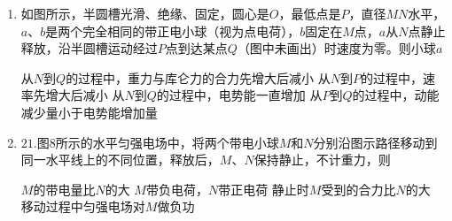 \begin{enumerate}[leftmargin=0em]
\begin{enumerate}
\end{enumerate}
\begin{figure}[h!]
\flushright

\end{figure}




\item
{}
如图所示，半圆槽光滑、绝缘、固定，圆心是$ O $，最低点是$ P $，直径$ MN $水平，$ a $、$ b $是两个完全相同的带正电小球（视为点电荷），$ b $固定在$ M $点，$ a $从$ N $点静止释放，沿半圆槽运动经过$ P $点到达某点$ Q $（图中未画出）时速度为零。则小球$ a $  
\begin{figure}[h!]
\centering

\end{figure}


\fourchoices
{从$ N $到$ Q $的过程中，重力与库仑力的合力先增大后减小}
{从$ N $到$ P $的过程中，速率先增大后减小}
{从$ N $到$ Q $的过程中，电势能一直增加}
{从$ P $到$ Q $的过程中，动能减少量小于电势能增加量}





\item
{}
$ 21 $.图$ 8 $所示的水平匀强电场中，将两个带电小球$ M $和$ N $分别沿图示路径移动到同一水平线上的不同位置，释放后，$ M $、$ N $保持静止，不计重力，则  
\begin{figure}[h!]
\centering

\end{figure}


\fourchoices
{$ M $的带电量比$ N $的大 }
{$ M $带负电荷，$ N $带正电荷}
{静止时$ M $受到的合力比$ N $的大 }
{移动过程中匀强电场对$ M $做负功}





\end{enumerate}
